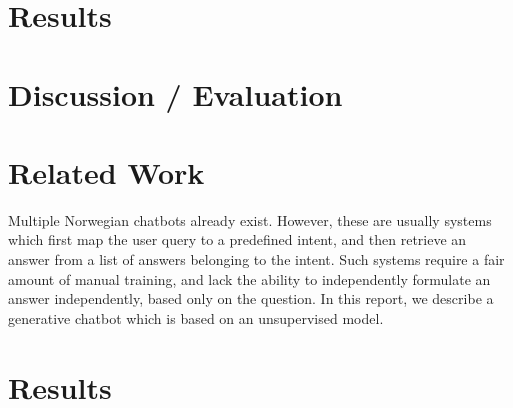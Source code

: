 \documentclass{article}
\begin{document}
\section{Results}


\section{Discussion / Evaluation}


\section{Related Work}

Multiple Norwegian chatbots already exist. However, these are usually systems
which first map the user query to a predefined intent, and then retrieve an
answer from a list of answers belonging to the intent. Such systems require a
fair amount of manual training, and lack the ability to independently formulate
an answer independently, based only on the question.  In this report, we
describe a generative chatbot which is based on an unsupervised model.


\section{Results}

\end{document}
